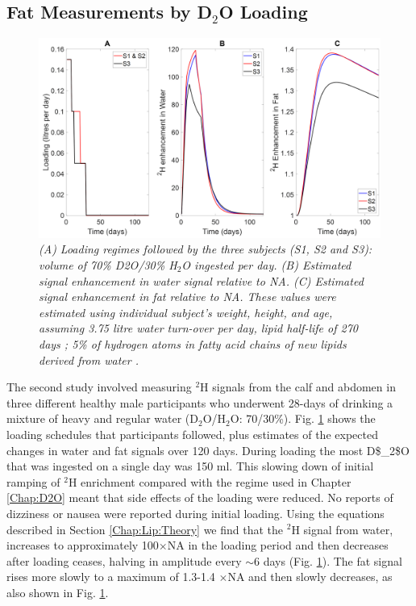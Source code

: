 \subsection{Fat Measurements by \texorpdfstring{D$_2$O}{D2O} Loading}

\begin{figure}
    \centering
    \includegraphics[width=1\textwidth]{Figures/Lipid/Loading_Routine.png}
    \caption{\textit{(A) Loading regimes followed by the three subjects (S1, S2 and S3): volume of 70\% D2O/30\% H$_2$O ingested per day. (B) Estimated signal enhancement in water signal relative to NA. (C) Estimated signal enhancement in fat relative to NA. These values were estimated using individual subject’s weight, height, and age, assuming 3.75 litre water turn-over per day, lipid half-life of 270 days \cite{Arner2011DynamicsDisease, Spalding2017ImpactTissue}; 5\% of hydrogen atoms in fatty acid chains of new lipids derived from water \cite{Turner2003MeasurementMIDA}.}}
    \label{fig:Lip:Load}
\end{figure}

The second study involved measuring $^2$H signals from the calf and abdomen in three different healthy male participants who underwent 28-days of drinking a mixture of heavy and regular water (D$_2$O/H$_2$O: 70/30\%). Fig. \ref{fig:Lip:Load} shows the loading schedules that participants followed, plus estimates of the expected changes in water and fat signals over 120 days. During loading the most \ac{D$_2$O} that was ingested on a single day was 150 ml. This slowing down of initial ramping of $^2$H enrichment compared with the regime used in Chapter \ref{Chap:D2O} meant that side effects of the loading were reduced. No reports of dizziness or nausea were reported during initial loading. Using the equations described in Section \ref{Chap:Lip:Theory} we find that the $^2$H signal from water, increases to approximately 100$\times$\ac{NA} in the loading period and then decreases after loading ceases, halving in amplitude every $\sim$6 days (Fig. \ref{fig:Lip:Load}). The fat signal rises more slowly to a maximum of 1.3-1.4 $\times$\ac{NA} and then slowly decreases, as also shown in Fig. \ref{fig:Lip:Load}.

